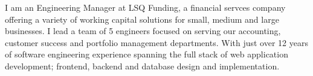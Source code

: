 

\begin{cvparagraph}

I am an Engineering Manager at LSQ Funding, a financial servces company offering a variety of working capital solutions for small, medium and large businesses. I lead a team of 5 engineers focused on serving our accounting, customer success and portfolio management departments. With just over 12 years of software engineering experience spanning the full stack of web application development; frontend, backend and database design and implementation.

\end{cvparagraph}
